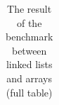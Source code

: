 \documentclass[a4paper,11pt]{article}
\begin{document}
\begin{table}[h]
\begin{center}
{\begin{tabular}{l|c|c|c|c|c|c}
    \end{tabular}
    }
    \caption{The result of the benchmark between linked lists and arrays (full table)}
    \label{tab:table2}
    \end{center}
\end{table}
\end{document}
